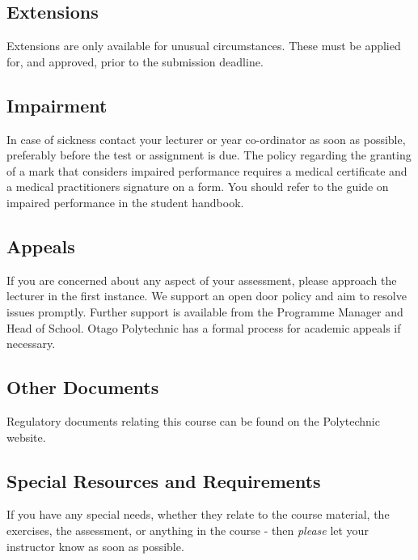 \documentclass{article}
\begin{document}
\subsection*{Extensions}
Extensions are only available for unusual circumstances.  These must be applied for, and approved, prior to the submission deadline.

\subsection*{Impairment}
In case of sickness contact your lecturer or year co-ordinator as soon as possible, preferably before the test or
assignment is due.  The policy regarding the granting of a mark that considers impaired performance requires a medical
certificate and a medical practitioners signature on a form. You should refer to the guide on impaired performance
in the student handbook.

\subsection*{Appeals}
If you are concerned about any aspect of your assessment, please approach the lecturer in the first instance.  We support
an open door policy and aim to resolve issues promptly.  Further support is available from the Programme
Manager and Head of School. Otago Polytechnic has a formal process for academic appeals if necessary.

\subsection*{Other Documents}
Regulatory documents relating this course can be found on the Polytechnic website.




\subsection*{Special Resources and Requirements}
If you have any special needs, whether they relate to the course material, the exercises, the assessment, or anything in the course -
then \textit{please} let your instructor know as soon as possible.
\end{document}
